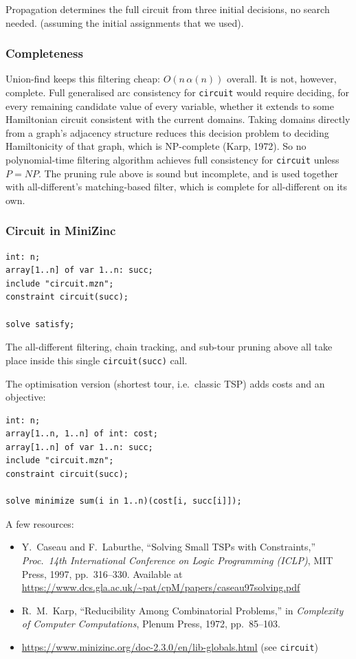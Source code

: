 \documentclass[11pt]{article}
\begin{document}
Propagation determines the full circuit from three initial decisions, no search needed. (assuming the initial assignments that we used).  

\subsubsection{Completeness}

Union-find keeps this filtering cheap: $O(n\,\alpha(n))$ overall. It is not, however, complete. Full generalised arc consistency for \texttt{circuit} would require deciding, for every remaining candidate value of every variable, whether it extends to some Hamiltonian circuit consistent with the current domains. Taking domains directly from a graph's adjacency structure reduces this decision problem to deciding Hamiltonicity of that graph, which is NP-complete (Karp, 1972). So no polynomial-time filtering algorithm achieves full consistency for \texttt{circuit} unless $P=NP$. The pruning rule above is sound but incomplete, and is used together with all-different's matching-based filter, which is complete for all-different on its own.

\subsubsection{Circuit in MiniZinc}

\begin{verbatim}
int: n;
array[1..n] of var 1..n: succ;
include "circuit.mzn";
constraint circuit(succ);

solve satisfy;
\end{verbatim}

The all-different filtering, chain tracking, and sub-tour pruning above all take place inside this single \texttt{circuit(succ)} call.

The optimisation version (shortest tour, i.e.\ classic TSP) adds costs and an objective:

\begin{verbatim}
int: n;
array[1..n, 1..n] of int: cost;
array[1..n] of var 1..n: succ;
include "circuit.mzn";
constraint circuit(succ);

solve minimize sum(i in 1..n)(cost[i, succ[i]]);
\end{verbatim}

A few resources:
{\small
\begin{itemize}
    \item Y.\ Caseau and F.\ Laburthe, ``Solving Small TSPs with Constraints,'' \emph{Proc.\ 14th International Conference on Logic Programming (ICLP)}, MIT Press, 1997, pp.\ 316--330. Available at \url{https://www.dcs.gla.ac.uk/~pat/cpM/papers/caseau97solving.pdf}
    \item R.\ M.\ Karp, ``Reducibility Among Combinatorial Problems,'' in \emph{Complexity of Computer Computations}, Plenum Press, 1972, pp.\ 85--103.
    \item \url{https://www.minizinc.org/doc-2.3.0/en/lib-globals.html} (see \texttt{circuit})
\end{itemize}
}
\end{document}
